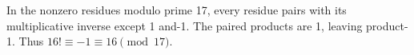 In the nonzero residues modulo prime 17, every residue pairs with its multiplicative inverse except 1 and-1. The paired products are 1, leaving product-1. Thus $16!\equiv-1\equiv\boxed{16}\pmod{17}$.
